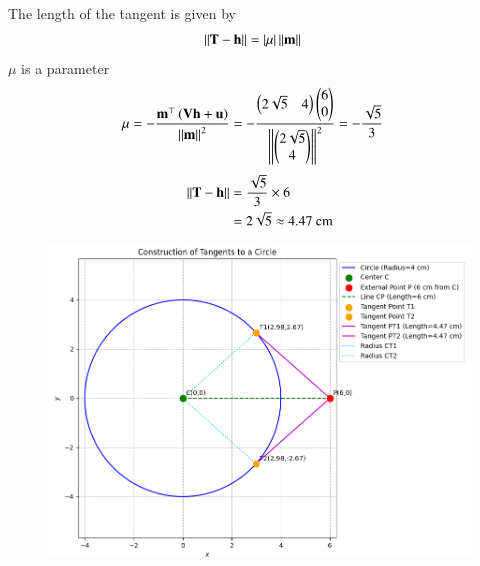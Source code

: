 \documentclass[journal]{IEEEtran}
\begin{document}
The length of the tangent is given by
\begin{align}
    \left\lVert\mathbf{T}-\mathbf{h}\right\rVert&=\left\vert\mu\right\vert \left\lVert\mathbf{m}\right\rVert
 \end{align}   
$\mu$ is a parameter
\begin{align}
    \mu&= -\dfrac{\mathbf{m}^{\top} \left(\mathbf{V}\mathbf{h} + \mathbf{u}\right)}{\left\lVert\mathbf{m}\right\rVert^2}=-\dfrac{\begin{pmatrix}2\sqrt{5} & 4\end{pmatrix} \begin{pmatrix}6\\0\end{pmatrix}}{\left\lVert\begin{pmatrix}2\sqrt{5} \\ 4\end{pmatrix}\right\rVert^2}=-\dfrac{\sqrt{5}}{3}
\end{align}
\begin{align}
    \left\lVert\mathbf{T}-\mathbf{h}\right\rVert&=\dfrac{\sqrt{5}}{3} \times 6 \\
    &=2\sqrt{5} \approx 4.47 \text{ cm}
\end{align}

\begin{figure}[H]
\centering
\includegraphics[width=0.9\columnwidth]{figs/fig1.png}
\caption{}
\label{fig:1}
\end{figure}
\end{document}
